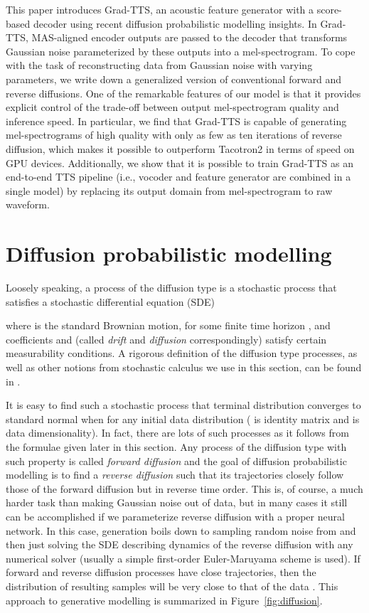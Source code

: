 \documentclass{article}
\begin{document}
This paper introduces Grad-TTS, an acoustic feature generator with a score-based decoder using recent diffusion probabilistic modelling insights. In Grad-TTS, MAS-aligned encoder outputs are passed to the decoder that transforms Gaussian noise parameterized by these outputs into a mel-spectrogram. To cope with the task of reconstructing data from Gaussian noise with varying parameters, we write down a generalized version of conventional forward and reverse diffusions. One of the remarkable features of our model is that it provides explicit control of the trade-off between output mel-spectrogram quality and inference speed. In particular, we find that Grad-TTS is capable of generating mel-spectrograms of high quality with only as few as ten iterations of reverse diffusion, which makes it possible to outperform Tacotron2 in terms of speed on GPU devices. Additionally, we show that it is possible to train Grad-TTS as an end-to-end TTS pipeline (i.e., vocoder and feature generator are combined in a single model) by replacing its output domain from mel-spectrogram to raw waveform.

\section{Diffusion probabilistic modelling}
\label{sec:diffusion}

Loosely speaking, a process of the diffusion type is a stochastic process that satisfies a stochastic differential equation (SDE)



where  is the standard Brownian motion,  for some finite time horizon , and coefficients  and  (called \textit{drift} and \textit{diffusion} correspondingly) satisfy certain measurability conditions. A rigorous definition of the diffusion type processes, as well as other notions from stochastic calculus we use in this section, can be found in \cite{SDE-book}.

It is easy to find such a stochastic process that terminal distribution  converges to standard normal  when  for any initial data distribution  ( is  identity matrix and  is data dimensionality). In fact, there are lots of such processes as it follows from the formulae given later in this section. Any process of the diffusion type with such property is called \textit{forward diffusion} and the goal of diffusion probabilistic modelling is to find a \textit{reverse diffusion} such that its trajectories closely follow those of the forward diffusion but in reverse time order. This is, of course, a much harder task than making Gaussian noise out of data, but in many cases it still can be accomplished if we parameterize reverse diffusion with a proper neural network. In this case, generation boils down to sampling random noise from  and then just solving the SDE describing dynamics of the reverse diffusion with any numerical solver (usually a simple first-order Euler-Maruyama scheme \cite{SDE-numerical} is used). If forward and reverse diffusion processes have close trajectories, then the distribution of resulting samples will be very close to that of the data . This approach to generative modelling is summarized in Figure~\ref{fig:diffusion}.
\end{document}
